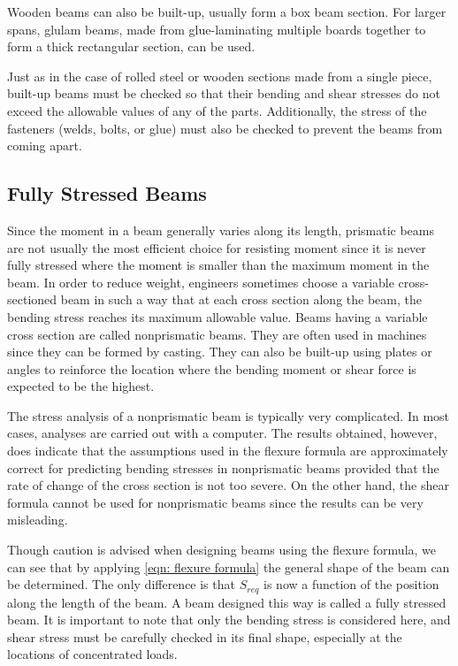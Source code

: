 \documentclass[a4paper,openany,nobib]{tufte-book}
\begin{document}
{{Wooden beams can also be built-up, usually form a box beam section. For
larger spans, glulam beams, made from glue-laminating multiple boards
together to form a thick rectangular section, can be used.

Just as in the case of rolled steel or wooden sections made from a
single piece, built-up beams must be checked so that their bending and
shear stresses do not exceed the allowable values of any of the parts.
Additionally, the stress of the fasteners (welds, bolts, or glue) must
also be checked to prevent the beams from coming apart.

\subsection{Fully Stressed Beams}
\label{fully-stressed-beams}
Since the moment in a beam generally varies along its length, prismatic
beams are not usually the most efficient choice for resisting moment
since it is never fully stressed where the moment is smaller than the
maximum moment in the beam. In order to reduce weight, engineers
sometimes choose a variable cross-sectioned beam in such a way that at
each cross section along the beam, the bending stress reaches its
maximum allowable value. Beams having a variable cross section are
called nonprismatic beams. They are often used in machines since they
can be formed by casting. They can also be built-up using plates or
angles to reinforce the location where the bending moment or shear force
is expected to be the highest.

The stress analysis of a nonprismatic beam is typically very
complicated. In most cases, analyses are carried out with a computer.
The results obtained, however, does indicate that the assumptions used
in the flexure formula are approximately correct for predicting bending
stresses in nonprismatic beams provided that the rate of change of the
cross section is not too severe. On the other hand, the shear formula
cannot be used for nonprismatic beams since the results can be very
misleading.

Though caution is advised when designing beams using the flexure
formula, we can see that by applying
\ref{eqn: flexure formula} the general shape of
the beam can be determined. The only difference is that \(S_{req}\) is now
a function of the position along the length of the beam. A beam designed
this way is called a fully stressed beam. It is important to note that
only the bending stress is considered here, and shear stress must be
carefully checked in its final shape, especially at the locations of
concentrated loads.

}}
\end{document}
